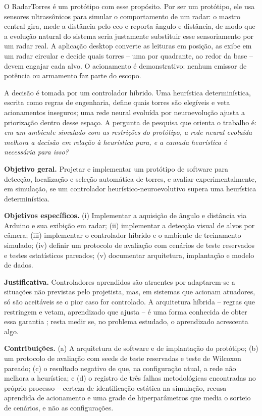 \documentclass[12pt,a4paper]{article}
\begin{document}
O RadarTorres é um protótipo com esse propósito. Por ser um protótipo, ele usa sensores
ultrassônicos para simular o comportamento de um radar: o mastro central gira, mede a distância
pelo eco e reporta ângulo e distância, de modo que a evolução natural do sistema seria justamente
substituir esse sensoriamento por um radar real. A aplicação desktop converte as leituras em
posição, as exibe em um radar circular e decide quais torres -- uma por quadrante, ao redor da base
-- devem engajar cada alvo. O acionamento é demonstrativo: nenhum emissor de potência ou armamento
faz parte do escopo.

A decisão é tomada por um controlador híbrido. Uma heurística determinística, escrita como regras
de engenharia, define quais torres são elegíveis e veta acionamentos inseguros; uma rede neural
evoluída por neuroevolução ajusta a priorização dentro desse espaço. A pergunta de pesquisa que
orienta o trabalho é: \textit{em um ambiente simulado com as restrições do protótipo, a rede
neural evoluída melhora a decisão em relação à heurística pura, e a camada heurística é necessária
para isso?}

\textbf{Objetivo geral.} Projetar e implementar um protótipo de software para detecção,
localização e seleção automática de torres, e avaliar experimentalmente, em simulação, se um
controlador heurístico-neuroevolutivo supera uma heurística determinística.

\textbf{Objetivos específicos.} (i) Implementar a aquisição de ângulo e distância via Arduino e sua
exibição em radar; (ii) implementar a detecção visual de alvos por câmera; (iii) implementar o
controlador híbrido e o ambiente de treinamento simulado; (iv) definir um protocolo de avaliação
com cenários de teste reservados e testes estatísticos pareados; (v) documentar arquitetura,
implantação e modelo de dados.

\textbf{Justificativa.} Controladores aprendidos são atraentes por adaptarem-se a situações não
previstas pelo projetista, mas, em sistemas que acionam atuadores, só são aceitáveis se o pior
caso for controlado. A arquitetura híbrida -- regras que restringem e vetam, aprendizado que
ajusta -- é uma forma conhecida de obter essa garantia
\cite{huang2020actionmasking,alshiekh2017shielding}; resta medir se, no problema estudado, o
aprendizado acrescenta algo.

\textbf{Contribuições.} (a) A arquitetura de software e de implantação do protótipo; (b) um
protocolo de avaliação com seeds de teste reservadas e teste de Wilcoxon pareado; (c) o resultado
negativo de que, na configuração atual, a rede não melhora a heurística; e (d) o registro de três
falhas metodológicas encontradas no próprio processo -- certeza de identificação estática na
simulação, recusa aprendida de acionamento e uma grade de hiperparâmetros que media o sorteio de
cenários, e não as configurações.
\end{document}
